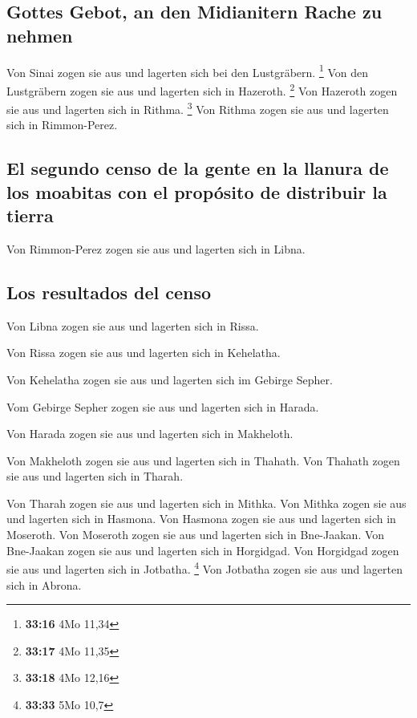 \hypertarget{gottes-gebot-an-den-midianitern-rache-zu-nehmen}{%
\subsection{Gottes Gebot, an den Midianitern Rache zu
nehmen}\label{gottes-gebot-an-den-midianitern-rache-zu-nehmen}}

 Von Sinai zogen sie aus und lagerten sich bei den
Lustgräbern. \footnote{\textbf{33:16} 4Mo 11,34}  Von den
Lustgräbern zogen sie aus und lagerten sich in Hazeroth. \footnote{\textbf{33:17}
  4Mo 11,35}  Von Hazeroth zogen sie aus und lagerten
sich in Rithma. \footnote{\textbf{33:18} 4Mo 12,16}  Von
Rithma zogen sie aus und lagerten sich in Rimmon-Perez.

\hypertarget{el-segundo-censo-de-la-gente-en-la-llanura-de-los-moabitas-con-el-propuxf3sito-de-distribuir-la-tierra}{%
\subsection{El segundo censo de la gente en la llanura de los moabitas
con el propósito de distribuir la
tierra}\label{el-segundo-censo-de-la-gente-en-la-llanura-de-los-moabitas-con-el-propuxf3sito-de-distribuir-la-tierra}}

 Von Rimmon-Perez zogen sie aus und lagerten sich in
Libna.

\hypertarget{los-resultados-del-censo}{%
\subsection{Los resultados del censo}\label{los-resultados-del-censo}}

 Von Libna zogen sie aus und lagerten sich in Rissa.

 Von Rissa zogen sie aus und lagerten sich in Kehelatha.

 Von Kehelatha zogen sie aus und lagerten sich im Gebirge
Sepher.

 Vom Gebirge Sepher zogen sie aus und lagerten sich in
Harada.

 Von Harada zogen sie aus und lagerten sich in Makheloth.

 Von Makheloth zogen sie aus und lagerten sich in
Thahath.  Von Thahath zogen sie aus und lagerten sich in
Tharah.

 Von Tharah zogen sie aus und lagerten sich in Mithka.
 Von Mithka zogen sie aus und lagerten sich in Hasmona.
 Von Hasmona zogen sie aus und lagerten sich in Moseroth.
 Von Moseroth zogen sie aus und lagerten sich in
Bne-Jaakan.  Von Bne-Jaakan zogen sie aus und lagerten
sich in Horgidgad.  Von Horgidgad zogen sie aus und
lagerten sich in Jotbatha. \footnote{\textbf{33:33} 5Mo 10,7}
 Von Jotbatha zogen sie aus und lagerten sich in Abrona.

